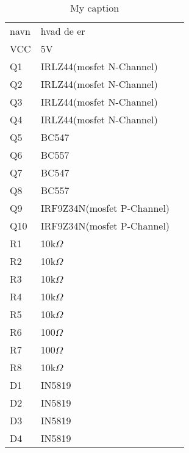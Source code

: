 \begin{table}[]
	\centering
	\caption{My caption}
	\label{my-label}
	\begin{tabular}{|l|l|l}
		\cline{1-2}
		navn & hvad de er                 &  \\ \cline{1-2}
		VCC  & 5V                         &  \\ \cline{1-2}
		Q1   & IRLZ44(mosfet N-Channel)   &  \\ \cline{1-2}
		Q2   & IRLZ44(mosfet N-Channel)   &  \\ \cline{1-2}
		Q3   & IRLZ44(mosfet N-Channel)   &  \\ \cline{1-2}
		Q4   & IRLZ44(mosfet N-Channel)   &  \\ \cline{1-2}
		Q5   & BC547                      &  \\ \cline{1-2}
		Q6   & BC557                      &  \\ \cline{1-2}
		Q7   & BC547                      &  \\ \cline{1-2}
		Q8   & BC557                      &  \\ \cline{1-2}
		Q9   & IRF9Z34N(mosfet P-Channel) &  \\ \cline{1-2}
		Q10  & IRF9Z34N(mosfet P-Channel) &  \\ \cline{1-2}
		R1   & 10k$\Omega$                &  \\ \cline{1-2}
		R2   & 10k$\Omega$                &  \\ \cline{1-2}
		R3   & 10k$\Omega$                &  \\ \cline{1-2}
		R4   & 10k$\Omega$                &  \\ \cline{1-2}
		R5   & 10k$\Omega$                &  \\ \cline{1-2}
		R6   & 100$\Omega$                &  \\ \cline{1-2}
		R7   & 100$\Omega$                &  \\ \cline{1-2}
		R8   & 10k$\Omega$                &  \\ \cline{1-2}
		D1   & IN5819                     &  \\ \cline{1-2}
		D2   & IN5819                     &  \\ \cline{1-2}
		D3   & IN5819                     &  \\ \cline{1-2}
		D4   & IN5819                     &  \\ \cline{1-2}
	\end{tabular}
\end{table}